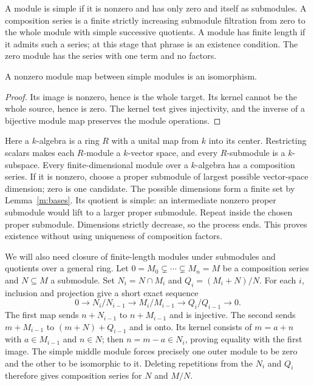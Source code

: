 A module is simple if it is nonzero and has only zero and itself as
submodules. A composition series is a finite strictly increasing
submodule filtration from zero to the whole module with simple
successive quotients. A module has finite length if it admits such
a series; at this stage that phrase is an existence condition.
The zero module has the series with one term and no factors.

\begin{lemma}\label{m:simple-map}
A nonzero module map between simple modules is an isomorphism.
\end{lemma}
\begin{proof}
Its image is nonzero, hence is the whole target. Its kernel cannot be
the whole source, hence is zero. The kernel test gives injectivity,
and the inverse of a bijective module map preserves the module operations.
\end{proof}

Here a $k$-algebra is a ring $R$ with a unital map from $k$ into its
center. Restricting scalars makes each $R$-module a $k$-vector space,
and every $R$-submodule is a $k$-subspace.
Every finite-dimensional module over a $k$-algebra has a composition
series. If it is nonzero, choose a proper submodule of largest possible
vector-space dimension; zero is one candidate. The possible dimensions
form a finite set by Lemma~\ref{m:bases}. Its quotient is simple:
an intermediate nonzero proper submodule would lift to a larger proper
submodule. Repeat inside the chosen proper submodule. Dimensions
strictly decrease, so the process ends. This proves existence without
using uniqueness of composition factors.

We will also need closure of finite-length modules under submodules
and quotients over a general ring. Let
$0=M_0\subsetneq\cdots\subsetneq M_n=M$ be a composition series
and $N\subseteq M$ a submodule. Set
$N_i=N\cap M_i$ and $Q_i=(M_i+N)/N$.
For each $i$, inclusion and projection give a short exact sequence
\begin{equation}\label{m:layer-exact}
0\longrightarrow N_i/N_{i-1}\longrightarrow M_i/M_{i-1}
\longrightarrow Q_i/Q_{i-1}\longrightarrow0.
\end{equation}
The first map sends $n+N_{i-1}$ to $n+M_{i-1}$ and is injective.
The second sends $m+M_{i-1}$ to $(m+N)+Q_{i-1}$ and is onto.
Its kernel consists of $m=a+n$ with $a\in M_{i-1}$ and $n\in N$;
then $n=m-a\in N_i$, proving equality with the first image.
The simple middle module forces precisely one outer module to be zero
and the other to be isomorphic to it. Deleting repetitions from the
$N_i$ and $Q_i$ therefore gives composition series for $N$ and $M/N$.

